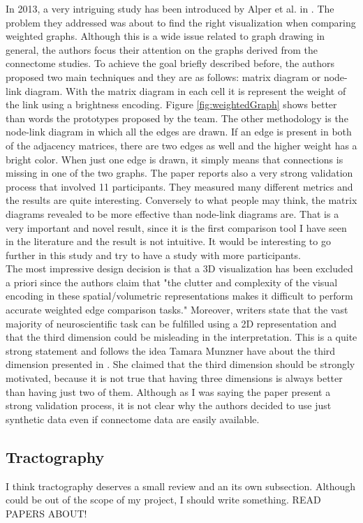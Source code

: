 \documentclass{article}
\begin{document}
\begin{multicols}{2}
In 2013, a very intriguing study has been introduced by Alper et al. in \cite{weightedGraphComparison}. The problem they addressed was about to find the right visualization when comparing weighted graphs. Although this is a wide issue related to graph drawing in general, the authors focus their attention on the graphs derived from the connectome studies. To achieve the goal briefly described before, the authors proposed two main techniques and they are as follows: matrix diagram or node-link diagram. With the matrix diagram in each cell it is represent the weight of the link using a brightness encoding. Figure \ref{fig:weightedGraph} shows better than words the prototypes proposed by the team. The other methodology is the node-link diagram in which all the edges are drawn. If an edge is present in both of the adjacency matrices, there are two edges as well and the higher weight has a bright color. When just one edge is drawn, it simply means that connections is missing in one of the two graphs.
The paper reports also a very strong validation process that involved 11 participants. They measured many different metrics and the results are quite interesting. Conversely to what people may think, the matrix diagrams revealed to be more effective than node-link diagrams are. That is a very important and novel result, since it is the first comparison tool I have seen in the literature and the result is not intuitive. It would be interesting to go further in this study and try to have a study with more participants.\\
The most impressive design decision is that a 3D visualization has been excluded a priori since the authors claim that "the clutter and complexity of the visual encoding in these spatial/volumetric representations makes it difficult to perform accurate weighted edge comparison tasks." Moreover, writers state that the vast majority of neuroscientific task can be fulfilled using a 2D representation and that the third dimension could be misleading in the interpretation. This is a quite strong statement and follows the idea Tamara Munzner have about the third dimension presented in \cite{processAndPitfalls}. She claimed that the third dimension should be strongly motivated, because it is not true that having three dimensions is always better than having just two of them. Although as I was saying the paper present a  strong validation process, it is not clear why the authors decided to use just synthetic data even if connectome data are easily available.

\subsection{Tractography}
I think tractography deserves a small review and an its own subsection. Although could be out of the scope of my project, I should write something. READ PAPERS ABOUT!


\end{multicols}
\end{document}
